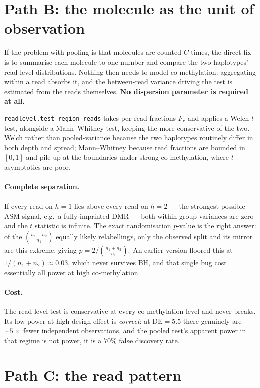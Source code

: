 \documentclass[11pt]{article}
\newcommand{\hpone}{h{=}1}
\newcommand{\hptwo}{h{=}2}
\begin{document}
\section{Path B: the molecule as the unit of observation}

If the problem with pooling is that molecules are counted $C$ times, the direct
fix is to summarise each molecule to one number and compare the two haplotypes'
read-level distributions. Nothing then needs to model co-methylation: aggregating
within a read absorbs it, and the between-read variance driving the test is
estimated from the reads themselves. \textbf{No dispersion parameter is required
at all.}

\texttt{readlevel.test\_region\_reads} takes per-read fractions $F_r$ and applies
a Welch $t$-test, alongside a Mann--Whitney test, keeping the more conservative
of the two. Welch rather than pooled-variance because the two haplotypes
routinely differ in both depth and spread; Mann--Whitney because read fractions
are bounded in $[0,1]$ and pile up at the boundaries under strong
co-methylation, where $t$ asymptotics are poor.

\paragraph{Complete separation.} If every read on $\hpone$ lies above every read
on $\hptwo$ --- the strongest possible ASM signal, e.g.\ a fully imprinted DMR
--- both within-group variances are zero and the $t$ statistic is infinite. The
exact randomisation $p$-value is the right answer: of the $\binom{n_1+n_2}{n_1}$
equally likely relabellings, only the observed split and its mirror are this
extreme, giving $p = 2/\binom{n_1+n_2}{n_1}$. An earlier version floored this at
$1/(n_1+n_2) \approx 0.03$, which never survives BH, and that single bug cost
essentially all power at high co-methylation.

\paragraph{Cost.} The read-level test is conservative at every co-methylation
level and never breaks. Its low power at high design effect is \emph{correct}:
at $\mathrm{DE} = 5.5$ there genuinely are $\sim\!5\times$ fewer independent
observations, and the pooled test's apparent power in that regime is not power,
it is a $70\%$ false discovery rate.

\section{Path C: the read pattern}
\end{document}
